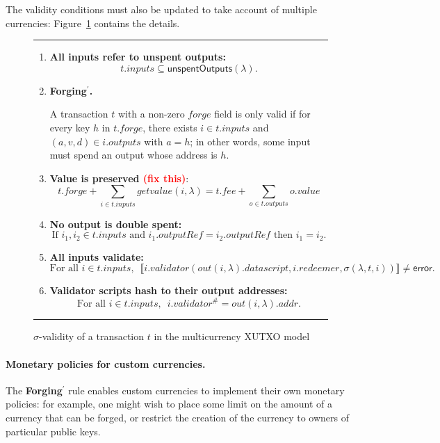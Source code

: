 \documentclass[a4paper]{article}
\newcommand{\red}[1]{\textcolor{red}{#1}}
\theoremstyle{definition}  %
\newcommand\rfskip{7pt}
\newenvironment{ruledfigure}[1]{\begin{figure}[#1]\hrule\vspace{\rfskip}}{\vspace{\rfskip}\hrule\end{figure}}
\newcommand{\mi}[1]{\ensuremath{\mathit{#1}}}
\newcommand{\inputs}{\mi{inputs}}
\newcommand{\outputs}{\mi{outputs}}
\newcommand{\forge}{\mi{forge}}
\newcommand{\fee}{\mi{fee}}
\newcommand{\addr}{\mi{addr}}
\newcommand{\val}{\mi{value}}  %
\newcommand{\validator}{\mi{validator}}
\newcommand{\redeemer}{\mi{redeemer}}
\newcommand{\datascript}{\mi{datascript}}
\newcommand{\txout}{\mi{out}}
\newcommand{\getvalue}{\mi{getvalue}}
\newcommand{\msf}[1]{\ensuremath{\mathsf{#1}}}
\newcommand{\unspent}{\msf{unspentOutputs}}
\begin{document}
\vspace{10pt}
\noindent The validity conditions must also be updated to take account
of multiple currencies: Figure~\ref{fig:mc-xutxo-validity} contains the details.


\begin{ruledfigure}{H}
  \begin{enumerate}
    \item \label{all-inputs-refer-to-unspent-outputs-2} \textbf{All
      inputs refer to unspent outputs:}
      \[
        t.\inputs \subseteq \unspent(\lambda).
      \]
    \item\label{forging-2} \textbf{Forging$^{\prime}$.}
      \begin{center}
        \parbox{0.8\textwidth}{
          A transaction $t$ with a non-zero \forge{} field is only valid if for
          every key $h$ in $t.\forge$, there exists $i \in t.\inputs$
          and $(a,v,d) \in i.\outputs$ with $a =h$; in other words, some input
          must spend an output whose address is $h$.
          }
      
      \end{center}
    \item \label{value-is-preserved-2} \textbf{Value is preserved \red{(fix this)}}:
    \[
      t.\forge + \sum_{i \in t.\inputs} \getvalue(i, \lambda) = t.\fee + \sum_{o \in t.\outputs} o.\val
    \]
    \item \label{no-double-spending-2} \textbf{No output is double spent:}
    \[
     \textrm{If } i_1, i_2 \in t.\inputs \textrm{ and }  i_1.\mathit{outputRef} = i_2.\mathit{outputRef}
     \textrm{ then } i_1 = i_2.
    \]
    \item\label{all-inputs-validate-2} \textbf{All inputs validate:}
    \[
    \textrm{For all } i \in t.\inputs,\enspace \llbracket
    i.\validator(\txout(i,
    \lambda).\datascript,i.\redeemer, \sigma(\lambda, t, i))
    \rrbracket \ne \textsf{error}.
      \]
    \item\label{validator-scripts-hash-2} \textbf{Validator scripts hash to their output addresses:}
    \[
      \textrm{For all } i \in t.\inputs,\enspace i.\validator^{\#} = \txout(i, \lambda).\addr.
    \]
  \end{enumerate}
  \caption{$\sigma$-validity of a transaction $t$ in the multicurrency XUTXO model}
  \label{fig:mc-xutxo-validity}

\end{ruledfigure}

\paragraph{Monetary policies for custom currencies.}
The \textbf{Forging$^{\prime}$}
rule enables custom currencies to implement their own monetary
policies: for example, one might wish to place some limit on the
amount of a currency that can be forged, or restrict the creation of
the currency to owners of particular public keys.
\end{document}
